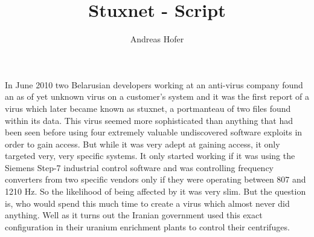 \documentclass{article}
\title{\vspace{-1cm}Stuxnet - Script}
\author{Andreas Hofer}
\begin{document}
	\maketitle
	In June 2010 two Belarusian developers working at an anti-virus company found an as of yet unknown virus on a customer's system and it was the first report of a virus which later became known as stuxnet, a portmanteau of two files found within its data.
	This virus seemed more sophisticated than anything that had been seen before using four extremely valuable undiscovered software exploits in order to gain access. But while it was very adept at gaining access, it only targeted very, very specific systems. It only started working if it was using the Siemens Step-7 industrial control software and was controlling frequency converters from two specific vendors only if they were operating between 807 and 1210 Hz. So the likelihood of being affected by it was very slim. But the question is, who would spend this much time to create a virus which almost never did anything. Well as it turns out the Iranian government used this exact configuration in their uranium enrichment plants to control their centrifuges.
\end{document}
